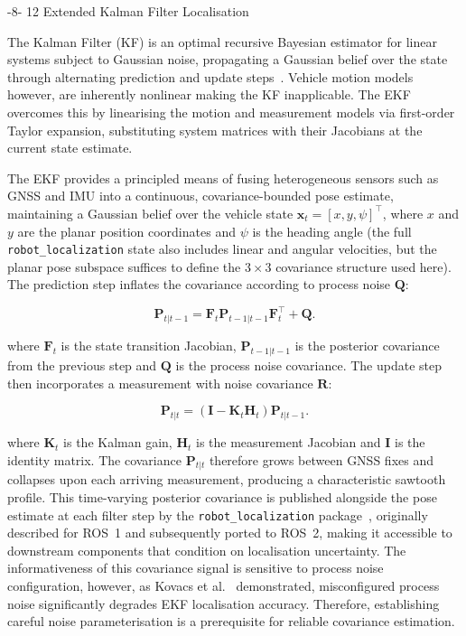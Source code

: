 \documentclass{sig-alternate}
\makeatletter
\renewcommand\subsection{\@startsection{subsection}{2}{\z@}%
    {-8\p@ \@plus -2\p@ \@minus -\p@}%
    {12\p@}%
    {\secfnt}}
\makeatother
\begin{document}
\subsection{Extended Kalman Filter Localisation}

The Kalman Filter (KF) is an optimal recursive Bayesian estimator for linear systems subject to Gaussian noise, propagating a Gaussian belief over the state through alternating prediction and update steps~\cite{thrun2005probabilistic}. Vehicle motion models however, are inherently nonlinear making the KF inapplicable. The EKF overcomes this by linearising the motion and measurement models via first-order Taylor expansion, substituting system matrices with their Jacobians at the current state estimate.

The EKF provides a principled means of fusing heterogeneous sensors such as GNSS and IMU into a continuous, covariance-bounded pose estimate, maintaining a Gaussian belief over the vehicle state $\mathbf{x}_t = [x, y, \psi]^\top$, where $x$ and $y$ are the planar position coordinates and $\psi$ is the heading angle (the full \texttt{robot\_localization} state also includes linear and angular velocities, but the planar pose subspace suffices to define the $3 \times 3$ covariance structure used here). The prediction step inflates the covariance according to process noise $\mathbf{Q}$:

\begin{equation}
    \mathbf{P}_{t|t-1} = \mathbf{F}_t \mathbf{P}_{t-1|t-1} \mathbf{F}_t^\top + \mathbf{Q}.
    \label{eq:ekf_predict}
\end{equation}

\noindent where $\mathbf{F}_t$ is the state transition Jacobian, $\mathbf{P}_{t-1|t-1}$ is the posterior covariance from the previous step and $\mathbf{Q}$ is the process noise covariance. The update step then incorporates a measurement with noise covariance $\mathbf{R}$:

\begin{equation}
    \mathbf{P}_{t|t} = (\mathbf{I} - \mathbf{K}_t \mathbf{H}_t) \mathbf{P}_{t|t-1}.
    \label{eq:ekf_update}
\end{equation}

\noindent where $\mathbf{K}_t$ is the Kalman gain, $\mathbf{H}_t$ is the measurement Jacobian and $\mathbf{I}$ is the identity matrix. The covariance $\mathbf{P}_{t|t}$ therefore grows between GNSS fixes and collapses upon each arriving measurement, producing a characteristic sawtooth profile. This time-varying posterior covariance is published alongside the pose estimate at each filter step by the \texttt{robot\_localization} package~\cite{moore2014ekf}, originally described for ROS~1 and subsequently ported to ROS~2, making it accessible to downstream components that condition on localisation uncertainty. The informativeness of this covariance signal is sensitive to process noise configuration, however, as Kovacs et al.~\cite{kovacs2025covariance} demonstrated, misconfigured process noise significantly degrades EKF localisation accuracy. Therefore, establishing careful noise parameterisation is a prerequisite for reliable covariance estimation.
\end{document}
